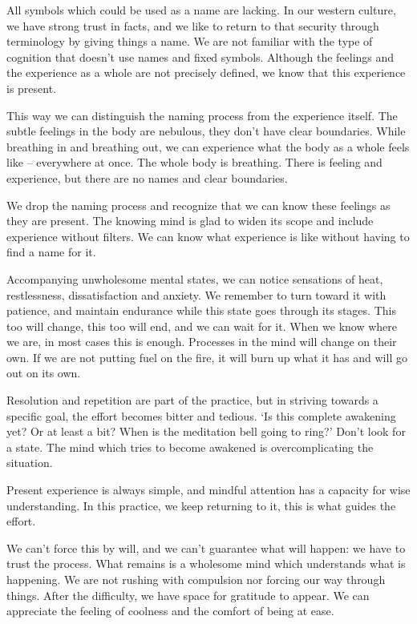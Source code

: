 All symbols which could be used as a name are lacking. In our western
culture, we have strong trust in facts, and we like to return to that
security through terminology by giving things a name. We are not
familiar with the type of cognition that doesn't use names and fixed
symbols. Although the feelings and the experience as a whole are not
precisely defined, we know that this experience is present.

This way we can distinguish the naming process from the experience
itself. The subtle feelings in the body are nebulous, they don't have
clear boundaries. While breathing in and breathing out, we can
experience what the body as a whole feels like -- everywhere at once.
The whole body is breathing. There is feeling and experience, but there
are no names and clear boundaries.

We drop the naming process and recognize that we can know these feelings
as they are present. The knowing mind is glad to widen its scope and
include experience without filters. We can know what experience is like
without having to find a name for it.


Accompanying unwholesome mental states, we can notice sensations of
heat, restlessness, dissatisfaction and anxiety. We remember to turn
toward it with patience, and maintain endurance while this state goes
through its stages. This too will change, this too will end, and we can
wait for it. When we know where we are, in most cases this is enough.
Processes in the mind will change on their own. If we are not putting
fuel on the fire, it will burn up what it has and will go out on its
own.

Resolution and repetition are part of the practice, but in striving
towards a specific goal, the effort becomes bitter and tedious. `Is this
complete awakening yet? Or at least a bit? When is the meditation bell
going to ring?' Don't look for a state. The mind which tries to become
awakened is overcomplicating the situation.

Present experience is always simple, and mindful attention has a
capacity for wise understanding. In this practice, we keep returning to
it, this is what guides the effort.

We can't force this by will, and we can't guarantee what will happen: we
have to trust the process. What remains is a wholesome mind which
understands what is happening. We are not rushing with compulsion nor
forcing our way through things. After the difficulty, we have space for
gratitude to appear. We can appreciate the feeling of coolness and the
comfort of being at ease.

